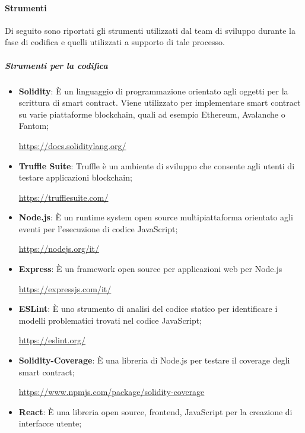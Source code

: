 \paragraph{Strumenti}    \label{paragraph:Strumenti}
Di seguito sono riportati gli strumenti utilizzati dal team di sviluppo durante la fase di codifica e quelli utilizzati a supporto di tale processo.
\subparagraph{Strumenti per la codifica}
\begin{itemize}
    \item \textbf{Solidity}: È un linguaggio di programmazione orientato agli oggetti per la scrittura di smart contract\glo{}. Viene utilizzato per implementare smart contract\glo{} su varie piattaforme blockchain\glo{}, quali ad esempio Ethereum\glo{}, Avalanche\glo{} o Fantom\glo{};
          \begin{center}\url{https://docs.soliditylang.org/}\end{center}
    \item \textbf{Truffle Suite}:
          Truffle è un ambiente di sviluppo che consente agli utenti di testare applicazioni blockchain\glo{};
          \begin{center}\url{https://trufflesuite.com/}\end{center}
    \item \textbf{Node.js}: È un runtime system\glo{} open source\glo{} multipiattaforma orientato agli eventi per l'esecuzione di codice JavaScript\glo{};
          \begin{center}\url{https://nodejs.org/it/}\end{center}
    \item \textbf{Express}: È un framework\glo{} open source\glo{} per applicazioni web per Node.js
          \begin{center}\url{https://expressjs.com/it/}\end{center}
    \item \textbf{ESLint}: È uno strumento di analisi del codice statico per identificare i modelli problematici trovati nel codice JavaScript\glo{};
          \begin{center}\url{https://eslint.org/}\end{center}
    \item \textbf{Solidity-Coverage}: È una libreria di Node.js per testare il coverage degli smart contract;
          \begin{center}\url{https://www.npmjs.com/package/solidity-coverage}\end{center}
    \item \textbf{React}: È una libreria open source\glo{}, frontend\glo{}, JavaScript\glo{} per la creazione di interfacce utente;

\end{itemize}
